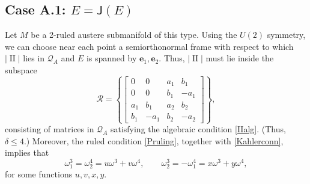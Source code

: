 \documentclass[12pt,reqno]{amsart}
\theoremstyle{definition}
\theoremstyle{remark}
\begin{document}
\subsection*{Case A.1: $E={\mathsf J}(E)$}  Let $M$ be a 2-ruled austere submanifold of this type.
Using the $U(2)$ symmetry, we can choose near each point a semiorthonormal frame with respect to
which $|{\operatorname{II}}|$ lies in ${\mathcal Q}_A$ and $E$ is spanned by ${\mathbf e}_1, {\mathbf e}_2$.
Thus, $|{\operatorname{II}}|$ must lie inside the subspace
\begin{equation}\label{arrdef}{\mathcal R} = \left\{
\begin{bmatrix} 0 & 0 & a_1  & b_1  \\ 0 & 0 & b_1 & -a_1 \\ a_1 & b_1 & a_2 & b_2
 \\ b_1 & -a_1 & b_2 &-a_2  \end{bmatrix}
\right\},\end{equation}
consisting of matrices in ${\mathcal Q}_A$ satisfying the algebraic condition \eqref{IIalg}.
(Thus, $\delta \le 4$.)
Moreover, the ruled condition \eqref{Pruling}, together with \eqref{Kahlerconn},
implies that
\begin{equation}\label{uvxycof}
{\omega}^3_1 ={\omega}^4_2= u{\omega}^3+v{\omega}^4, \qquad {\omega}^3_2 = -{\omega}^4_1 = x{\omega}^3 + y{\omega}^4,
\end{equation}
for some functions $u,v,x,y$.
\end{document}
